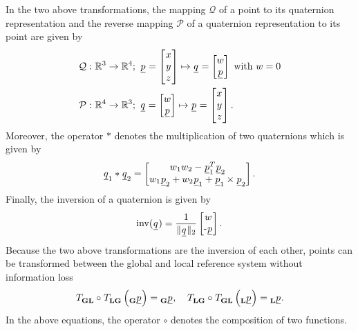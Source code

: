 In the two above transformations,
the mapping $\mathcal{Q}$
of a point to its quaternion representation 
and the reverse mapping $\mathcal{P}$ 
of a quaternion representation to its point  
are given by
\begin{align}
    \mathcal{Q}
    :\ 
    & \mathbb{R}^3 \rightarrow \mathbb{R}^4
    ;\
    \pos[]{}{}{}{} = \begin{bmatrix} \x[]{}{}{}{} \\ \y[]{}{}{}{} \\ \z[]{}{}{}{} \end{bmatrix} 
    \mapsto
    \quat[]{}{}{}{} = \begin{bmatrix} w \\ \underline p \end{bmatrix} 
    \text{ with } w = 0
    \nonumber \\
    \mathcal{P}
    :\ 
    &\mathbb{R}^4 \rightarrow \mathbb{R}^3
    ;\
    \quat[]{}{}{}{} = \begin{bmatrix} w \\ \underline p \end{bmatrix} 
    \mapsto
    \pos[]{}{}{}{} = \begin{bmatrix} \x[]{}{}{}{} \\ \y[]{}{}{}{} \\ \z[]{}{}{}{} \end{bmatrix}.
\end{align}
Moreover, the operator $*$ denotes the multiplication of two quaternions which is given by
\begin{align}
    \quat[]{}{1}{}{} * \quat[]{}{2}{}{}
    = 
    \begin{bmatrix}
        w_1 w_2 - \pos[]{T}{1}{}{} \pos[]{}{2}{}{}\\ 
        w_1 \pos[]{}{2}{}{} + w_2 \pos[]{}{1}{}{} + \pos[]{}{1}{}{} \times \pos[]{}{2}{}{}
    \end{bmatrix}.
\end{align}
Finally, the inversion of a quaternion is given by
\begin{align}
    \mathrm{inv}(\quat[]{}{}{}{}) 
    = 
    \frac{1}{\| \quat[]{}{}{}{} \|_2}
    \begin{bmatrix} w \\ \text - \pos[]{}{}{}{} \end{bmatrix}.
\end{align}
Because the two above transformations are the inversion of each other,
points can be transformed between the global and local reference system
without information loss
\begin{equation}
    \trafo[]{}{\grs\lrs}{}{} \circ \trafo[]{}{\lrs\grs}{}{} 
    \left( \pos[]{}{}{\grs}{} \right)
    =
    \pos[]{}{}{\grs}{}
    ,\quad
    \trafo[]{}{\lrs\grs}{}{} \circ \trafo[]{}{\grs\lrs}{}{} 
    \left( \pos[]{}{}{\lrs}{} \right)
    =
    \pos[]{}{}{\lrs}{}.
\end{equation}
In the above equations, the operator $\circ$ denotes the composition of two functions.



